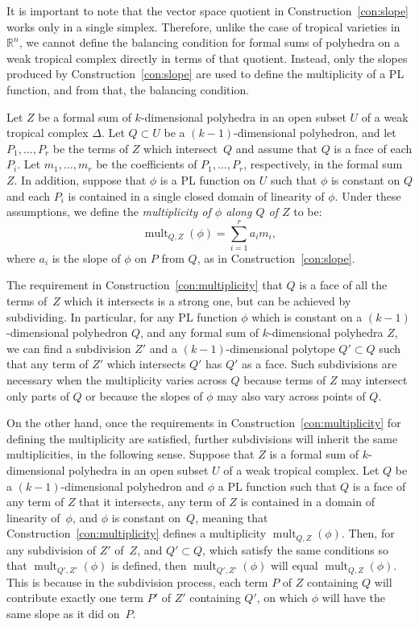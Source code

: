 \documentclass[11pt,reqno]{amsart}
\theoremstyle{definition}
\newcommand{\defi}[1]{\emph{#1}}
\newcommand{\mult}{\operatorname{mult}}
\newcommand{\RR}{\mathbb R}
\begin{document}
It is important to note that the vector space quotient in
Construction~\ref{con:slope} works only in a single simplex. Therefore, unlike
the case of tropical varieties in $\RR^n$, we cannot define the balancing
condition for formal sums of polyhedra on a weak tropical complex directly in
terms of that quotient. Instead, only the slopes produced by
Construction~\ref{con:slope} are used to define the multiplicity of a PL
function, and from that, the balancing condition.

\begin{const}\label{con:multiplicity}
Let $Z$ be a formal sum of $k$-dimensional polyhedra in an open subset $U$ of a
weak tropical complex $\Delta$. Let $Q \subset U$ be a $(k-1)$-dimensional
polyhedron, and let $P_1, \ldots, P_r$ be the terms of $Z$ which intersect~$Q$
and assume
that $Q$ is a face of each $P_i$. Let $m_1, \ldots, m_r$ be the
coefficients of $P_1, \ldots, P_r$, respectively, in the formal sum $Z$. In
addition, suppose that $\phi$ is a PL function on $U$ such that $\phi$ is
constant on $Q$ and each $P_i$ is contained in a single closed domain of
linearity of $\phi$. Under these assumptions, we define the \defi{multiplicity
of $\phi$ along $Q$ of
$Z$} to be:
\begin{equation*}
\mult_{Q,Z}(\phi) = \sum_{i=1}^r a_i m_i,
\end{equation*}
where $a_i$ is the slope of $\phi$ on $P$ from $Q$, as in
Construction~\ref{con:slope}.
\end{const}

The requirement in Construction~\ref{con:multiplicity} that $Q$ is a face of all
the terms of~$Z$ which it intersects is a strong one, but can be achieved by
subdividing. In particular, for any PL function $\phi$ which is constant on a
$(k-1)$-dimensional polyhedron $Q$, and any formal sum of $k$-dimensional
polyhedra $Z$, we can find a subdivision $Z'$ and a $(k-1)$-dimensional polytope
$Q' \subset Q$ such that any term of $Z'$ which intersects $Q'$ has $Q'$ as a
face. Such subdivisions are necessary when the multiplicity varies across $Q$
because terms of $Z$ may intersect only parts of $Q$ or because the slopes of
$\phi$ may also vary across points of $Q$.

On the other hand, once the requirements in Construction~\ref{con:multiplicity}
for defining the multiplicity are satisfied, further
subdivisions will inherit the same multiplicities, in the following sense.
Suppose that $Z$ is a formal sum of
$k$-dimensional polyhedra in an open subset $U$ of a weak tropical complex. Let
$Q$ be a $(k-1)$-dimensional polyhedron and $\phi$ a PL function such that $Q$
is a face of any term of $Z$ that it intersects, any term of $Z$ is contained in
a domain of linearity of~$\phi$, and $\phi$ is constant on~$Q$, meaning that
Construction~\ref{con:multiplicity} defines a multiplicity $\mult_{Q,Z}(\phi)$.
Then, for any subdivision of $Z'$ of~$Z$, and $Q' \subset Q$, which satisfy the
same conditions so that $\mult_{Q', Z'}(\phi)$ is defined, then
$\mult_{Q',Z'}(\phi)$ will equal $\mult_{Q, Z}(\phi)$. This is because in the
subdivision process, each term $P$ of $Z$ containing $Q$ will contribute exactly
one term $P'$ of $Z'$ containing $Q'$, on which $\phi$ will have the same slope
as it did on~$P$.
\end{document}
